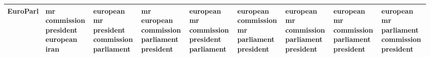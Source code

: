 \documentclass[11pt,a4paper]{article}
\begin{document}
\begin{appendices}
\begin{table}[htb]
\begin{tiny}
\begin{tabular}{|p{}|p{}|p{}|p{}|p{}|p{}|p{}|p{}|p{}|}
    EuroParl & mr \newline commission \newline president \newline european \newline iran & european \newline mr \newline president \newline commission \newline parliament & mr \newline european \newline commission \newline parliament \newline president & european \newline mr \newline commission \newline president \newline parliament & european \newline commission \newline mr \newline parliament \newline president & european \newline mr \newline commission \newline parliament \newline president & european \newline mr \newline commission \newline parliament \newline president & european \newline mr \newline parliament \newline commission \newline president\\\hline

\end{tabular}
\end{tiny}
\end{table}
\end{appendices}
\end{document}
